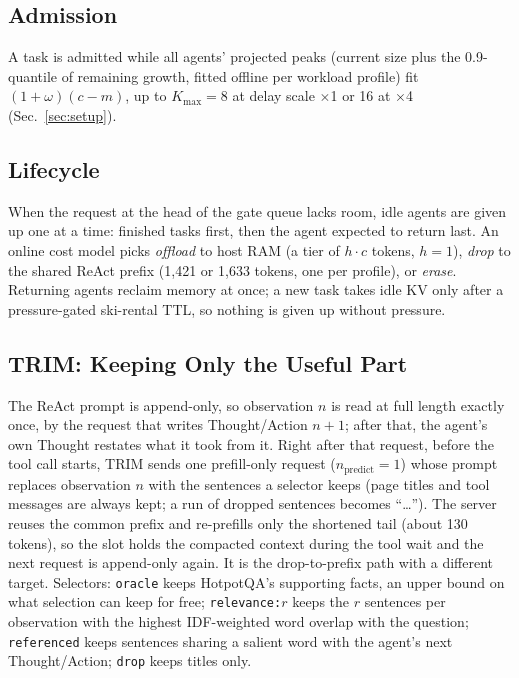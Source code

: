 \documentclass[conference]{IEEEtran}
\newcommand{\x}{$\times$}
\newcommand{\cfg}[1]{\texttt{#1}}
\begin{document}
\subsection{Admission}
A task is admitted while all agents' projected peaks (current size plus the 0.9-quantile of remaining
growth, fitted offline per workload profile) fit $(1+\omega)(c-m)$, up to $K_\mathrm{max}=8$ at delay
scale \x1 or 16 at \x4 (Sec.~\ref{sec:setup}).

\subsection{Lifecycle}
When the request at the head of the gate queue lacks room, idle agents are given up one at a time:
finished tasks first, then the agent expected to return last. An online cost model picks
\emph{offload} to host RAM (a tier of $h\cdot c$ tokens, $h=1$), \emph{drop} to the shared ReAct
prefix (1,421 or 1,633 tokens, one per profile), or \emph{erase}. Returning agents reclaim memory at
once; a new task takes idle KV only after a pressure-gated ski-rental TTL, so nothing is given up
without pressure.

\subsection{TRIM: Keeping Only the Useful Part}\label{sec:trim}
The ReAct prompt is append-only, so observation $n$ is read at full length exactly once, by the
request that writes Thought/Action $n{+}1$; after that, the agent's own Thought restates what it took
from it. Right after that request, before the tool call starts, TRIM sends one prefill-only request
($n_\mathrm{predict}=1$) whose prompt replaces observation $n$ with the sentences a selector keeps
(page titles and tool messages are always kept; a run of dropped sentences becomes ``\ldots''). The
server reuses the common prefix and re-prefills only the shortened tail (about 130 tokens), so the slot
holds the compacted context during the tool wait and the next request is append-only again. It is the
drop-to-prefix path with a different target. Selectors: \cfg{oracle} keeps HotpotQA's supporting
facts, an upper bound on what selection can keep for free; \cfg{relevance:$r$} keeps the $r$
sentences per observation with the highest IDF-weighted word overlap with the question;
\cfg{referenced} keeps sentences sharing a salient word with the agent's next Thought/Action;
\cfg{drop} keeps titles only.
\end{document}
